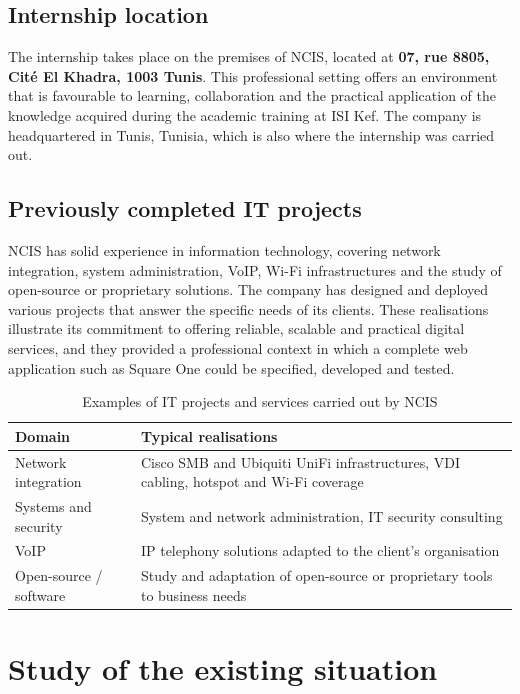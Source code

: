 \documentclass[12pt,a4paper,oneside]{report}
\begin{document}
\subsection{Internship location}
The internship takes place on the premises of NCIS, located at \textbf{07, rue 8805, Cit\'e El Khadra, 1003 Tunis}. This professional setting offers an environment that is favourable to learning, collaboration and the practical application of the knowledge acquired during the academic training at ISI Kef. The company is headquartered in Tunis, Tunisia, which is also where the internship was carried out.

\subsection{Previously completed IT projects}
NCIS has solid experience in information technology, covering network integration, system administration, VoIP, Wi-Fi infrastructures and the study of open-source or proprietary solutions. The company has designed and deployed various projects that answer the specific needs of its clients. These realisations illustrate its commitment to offering reliable, scalable and practical digital services, and they provided a professional context in which a complete web application such as Square One could be specified, developed and tested.

\begin{table}[H]
\centering
\caption{Examples of IT projects and services carried out by NCIS}
\label{tab:ncis-projects}
\begin{tabularx}{0.92\linewidth}{lX}
\toprule
\textbf{Domain} & \textbf{Typical realisations} \\
\midrule
Network integration & Cisco SMB and Ubiquiti UniFi infrastructures, VDI cabling, hotspot and Wi-Fi coverage \\
Systems and security & System and network administration, IT security consulting \\
VoIP & IP telephony solutions adapted to the client's organisation \\
Open-source / software & Study and adaptation of open-source or proprietary tools to business needs \\
\bottomrule
\end{tabularx}
\end{table}

\section{Study of the existing situation}
\end{document}
